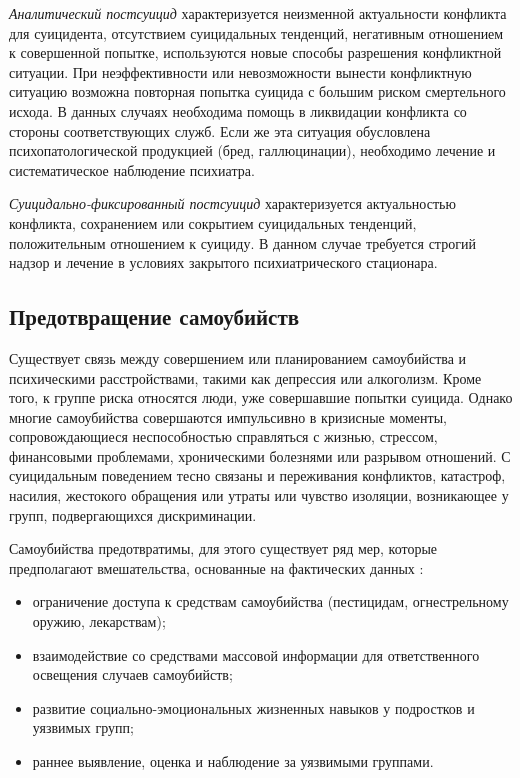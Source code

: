 \textit{Аналитический постсуицид} характеризуется неизменной актуальности конфликта для суицидента, отсутствием суицидальных тенденций, негативным отношением к совершенной попытке, используются новые способы разрешения конфликтной ситуации. При неэффективности или невозможности вынести конфликтную ситуацию возможна повторная попытка суицида с большим риском смертельного исхода. В данных случаях необходима помощь в ликвидации конфликта со стороны соответствующих служб. Если же эта ситуация обусловлена психопатологической продукцией (бред, галлюцинации), необходимо лечение и систематическое наблюдение психиатра.

\textit{Суицидально-фиксированный постсуицид} характеризуется актуальностью конфликта, сохранением или сокрытием суицидальных тенденций, положительным отношением к суициду. В данном случае требуется строгий надзор и лечение в условиях закрытого психиатрического стационара.

\subsection{Предотвращение самоубийств}

Существует связь между совершением или планированием самоубийства и психическими расстройствами, такими как депрессия или алкоголизм. Кроме того, к группе риска относятся люди, уже совершавшие попытки суицида. Однако многие самоубийства совершаются импульсивно в кризисные моменты, сопровождающиеся неспособностью справляться с жизнью, стрессом, финансовыми проблемами, хроническими болезнями или разрывом отношений. С суицидальным поведением тесно связаны и переживания конфликтов, катастроф, насилия, жестокого обращения или утраты или чувство изоляции, возникающее у групп, подвергающихся дискриминации. \cite{suicideVOZDouble}

Самоубийства предотвратимы, для этого существует ряд мер, которые предполагают вмешательства, основанные на фактических данных \cite{suicideVOZDouble}:

\begin{itemize}
	\item ограничение доступа к средствам самоубийства (пестицидам, огнестрельному оружию, лекарствам);
	\item взаимодействие со средствами массовой информации для ответственного освещения случаев самоубийств;
	\item развитие социально-эмоциональных жизненных навыков у подростков и уязвимых групп;
	\item раннее выявление, оценка и наблюдение за уязвимыми группами.
\end{itemize}

